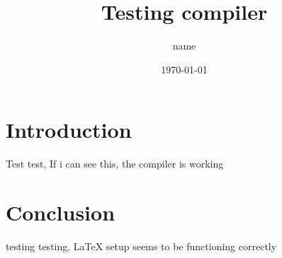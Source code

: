 \documentclass{article}
\title{Testing compiler}
\author{name}
\date{\today}
\begin{document}
\maketitle

\section{Introduction}
Test test, If i can see this, the compiler is working


\section{Conclusion}
testing testing, LaTeX setup seems to be functioning correctly
\end{document}
